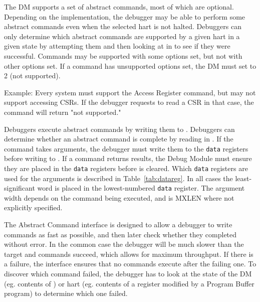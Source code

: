 The DM supports a set of abstract commands, most of which
are optional. Depending on the implementation, the debugger may
be able to perform
some abstract commands even when the selected hart is not halted.
Debuggers can only determine which abstract commands
are supported by a given hart in a given state by attempting them
and then looking at \Fcmderr in \Rabstractcs to see if they were successful.
Commands may be supported with some options set, but not with other options
set. If a command has unsupported options set, the DM must set \Fcmderr to 2
(not supported).

\begin{commentary}
    Example: Every system must support the Access Register command, but may not
    support accessing CSRs. If the debugger requests to read a CSR in that
    case, the command will return "not supported."
\end{commentary}

Debuggers execute abstract commands by writing them to \Rcommand.
Debuggers can determine whether an abstract command is complete by
reading \Fbusy in \Rabstractcs.
If the command takes arguments, the debugger
must write them to the {\tt data} registers before writing to \Rcommand. If a
command returns results, the Debug Module must ensure they are placed
in the {\tt data} registers before \Fbusy is cleared.
Which {\tt data} registers are used for the arguments is
described in Table~\ref{tab:datareg}.  In all cases the least-significant word
is placed in the lowest-numbered {\tt data} register. The argument width
depends on the command being executed, and is MXLEN where not explicitly
specified.

\begin{commentary}
    The Abstract Command interface is designed to allow a debugger to write
    commands as fast as possible, and then later check whether they completed
    without error.  In the common case the debugger will be much slower than
    the target and commands succeed, which allows for maximum throughput. If
    there is a failure, the interface ensures that no commands execute after
    the failing one.  To discover which command failed, the debugger has to
    look at the state of the DM (eg. contents of \Rcommand) or hart (eg.
    contents of a register modified by a Program Buffer program) to determine
    which one failed.
\end{commentary}

